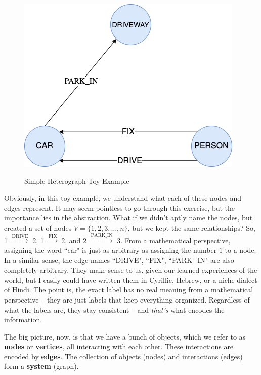 \documentclass[12pt]{article}
\theoremstyle{definition}
\begin{document}
\begin{figure}[hbt!]
\vspace{-0.125in}
\par
\begin{center}
\caption{Simple Heterograph Toy Example}
\vspace{0.1in}
\label{fig:simpleHetGraph}
\includegraphics[scale=0.4]{Figures/SimpleHetGraph.png}
\end{center}
\par
\vspace{-0.25in}
\medskip
\end{figure}

Obviously, in this toy example, we understand what each of these nodes and edges represent. It may seem pointless to go through this exercise, but the importance lies in the abstraction. What if we didn't aptly name the nodes, but created a set of nodes $V = \{1, 2, 3, \dots, n\}$, but we kept the same relationships? So, 1 $\xrightarrow{\text{DRIVE}}$ 2, 1 $\xrightarrow{\text{FIX}}$ 2, and 2 $\xrightarrow{\text{PARK\_IN}}$ 3. From a mathematical perspective, assigning the word ``car" is just as arbitrary as assigning the number $1$ to a node. In a similar sense, the edge names ``DRIVE", ``FIX", ``PARK\_IN" are also completely arbitrary. They make sense to us, given our learned experiences of the world, but I easily could have written them in Cyrillic, Hebrew, or a niche dialect of Hindi. The point is, the exact label has no real meaning from a mathematical perspective -- they are just labels that keep everything organized. Regardless of what the labels are, they stay consistent -- and \textit{that's} what encodes the information.

The big picture, now, is that we have a bunch of objects, which we refer to as \textbf{nodes} or \textbf{vertices}, all interacting with each other. These interactions are encoded by \textbf{edges}. The collection of objects (nodes) and interactions (edges) form a \textbf{system} (graph). 
\end{document}
